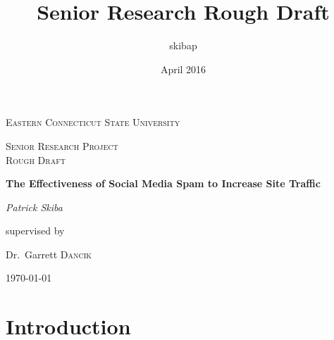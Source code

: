 \documentclass{article}
\title{Senior Research Rough Draft}
\author{skibap }
\date{April 2016}
\begin{document}
\begin{titlepage}
	\centering
	{\scshape\LARGE Eastern Connecticut State University \par}
	\vspace{1cm}
	{\scshape\Large Senior Research Project \\ Rough Draft\par}
	\vspace{1.5cm}
	{\huge\bfseries The Effectiveness of Social Media Spam to Increase Site Traffic\par}
	\vspace{2cm}
	{\Large\itshape Patrick Skiba\par}
	\vfill
	supervised by\par
	Dr.~Garrett \textsc{Dancik}

	\vfill

	{\large \today\par}
\end{titlepage}

\section{Introduction}
\end{document}
